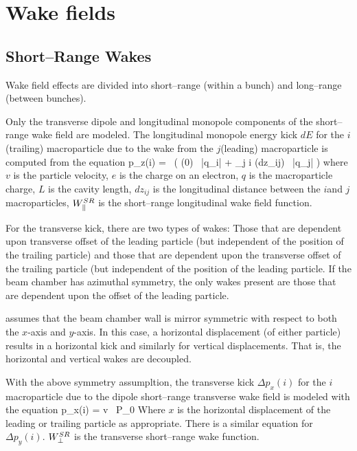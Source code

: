 \section{Wake fields}
\label{s:wake.fields}

\subsection{Short--Range Wakes}
\label{s:wake.short}

Wake field effects are divided into short--range (within a bunch) and
long--range (between bunches).

Only the transverse dipole and longitudinal monopole components of the
short--range wake field are modeled. The longitudinal monopole energy
kick $dE$ for the $i$\Th (trailing) macroparticle due to the wake from
the $j$\Th (leading) macroparticle is computed from the equation
\Begineq
  \Delta p_z(i) =  \, \left(
        \WlS(0) \,  |q_i| +
        \sum_{j \ne i} \WlS(dz_{ij}) \, |q_j| \right)
  \label{delvp}
\Endeq
where $v$ is the particle velocity, $e$ is the charge on an electron,
$q$ is the macroparticle charge, $L$ is the cavity length, $dz_{ij}$
is the longitudinal distance between the $i$\Th and $j$\Th
macroparticles, $W^{SR}_\parallel$ is the short--range longitudinal wake field
function.

For the transverse kick, there are two types of wakes: Those that are
dependent upon transverse offset of the leading particle (but
independent of the position of the trailing particle) and those that
are dependent upon the transverse offset of the trailing particle (but
independent of the position of the leading particle. If the beam
chamber has azimuthal symmetry, the only wakes present are those that
are dependent upon the offset of the leading particle. 

\bmad assumes that the beam chamber wall is mirror symmetric with
respect to both the $x$-axis and $y$-axis. In this case, a horizontal
displacement (of either particle) results in a horizontal kick and
similarly for vertical displacements. That is, the horizontal and
vertical wakes are decoupled. 

With the above symmetry assumpltion, 
the transverse kick $\Delta p_x(i)$ for the $i$\Th macroparticle due to the 
dipole short--range transverse wake field is modeled with the equation
\Begineq
  \Delta p_x(i) = 
                 {v \, P_0}
  \label{pelqxw}
\Endeq
Where $x$ is the horizontal displacement of the leading or trailing
particle as appropriate. There is a similar equation for $\Delta
p_y(i)$. $W^{SR}_\perp$ is the transverse short--range wake function.


